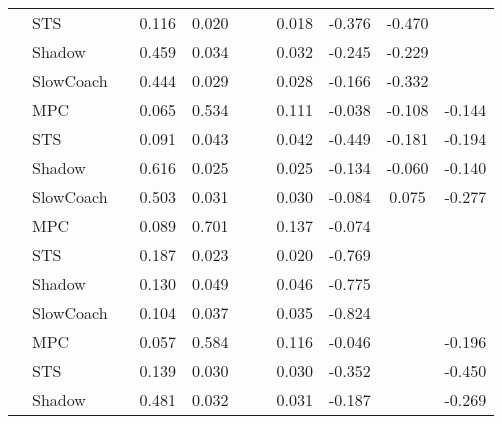 \begin{tabular}{|l|l|*{9}{c|}}
                                                           & STS &       &     0.116 &     0.020 &     &     &  0.018 &  -0.376 &  -0.470 &       \\
                                                           & Shadow &       &     0.459 &     0.034 &     &     &  0.032 &  -0.245 &  -0.229 &       \\
                                                           & SlowCoach &       &     0.444 &     0.029 &     &     &  0.028 &  -0.166 &  -0.332 &       \\
\midrule
[False, True, True, False, False, True, True, True, True] & MPC &       &     0.065 &     0.534 &     &     &  0.111 &  -0.038 &  -0.108 &   -0.144 \\
                                                           & STS &       &     0.091 &     0.043 &     &     &  0.042 &  -0.449 &  -0.181 &   -0.194 \\
                                                           & Shadow &       &     0.616 &     0.025 &     &     &  0.025 &  -0.134 &  -0.060 &   -0.140 \\
                                                           & SlowCoach &       &     0.503 &     0.031 &     &     &  0.030 &  -0.084 &   0.075 &   -0.277 \\
\midrule
[False, True, True, False, False, True, True, False, False] & MPC &       &     0.089 &     0.701 &     &     &  0.137 &  -0.074 &      &       \\
                                                           & STS &       &     0.187 &     0.023 &     &     &  0.020 &  -0.769 &      &       \\
                                                           & Shadow &       &     0.130 &     0.049 &     &     &  0.046 &  -0.775 &      &       \\
                                                           & SlowCoach &       &     0.104 &     0.037 &     &     &  0.035 &  -0.824 &      &       \\
\midrule
[False, True, True, False, False, True, True, False, True] & MPC &       &     0.057 &     0.584 &     &     &  0.116 &  -0.046 &      &   -0.196 \\
                                                           & STS &       &     0.139 &     0.030 &     &     &  0.030 &  -0.352 &      &   -0.450 \\
                                                           & Shadow &       &     0.481 &     0.032 &     &     &  0.031 &  -0.187 &      &   -0.269 \\

\end{tabular}
